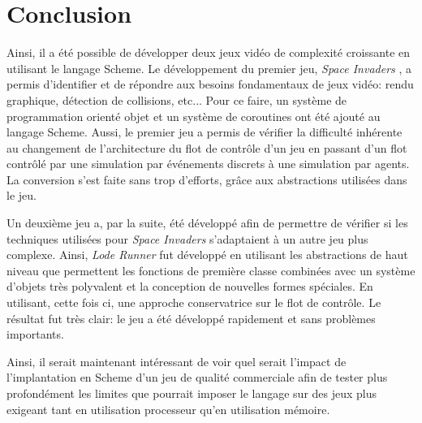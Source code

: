 \documentclass[12pt,oneside,letterpaper,francais]{book}
\newcommand{\lr}{{\textit{Lode Runner }}}
\newcommand{\si}{{\textit{Space Invaders }}}
\begin{document}
\section{Conclusion}
Ainsi, il a été possible de développer deux jeux vidéo de complexité
croissante en utilisant le langage Scheme. Le développement du premier
jeu, \si, a permis d'identifier et de répondre aux besoins
fondamentaux de jeux vidéo: rendu graphique, détection de collisions,
etc... Pour ce faire, un système de programmation orienté objet et un
système de coroutines ont été ajouté au langage Scheme. Aussi, le
premier jeu a permis de vérifier la difficulté inhérente au changement
de l'architecture du flot de contrôle d'un jeu en passant d'un flot
contrôlé par une simulation par événements discrets à une simulation
par agents. La conversion s'est faite sans trop d'efforts, grâce aux
abstractions utilisées dans le jeu.

Un deuxième jeu a, par la suite, été développé afin de permettre de
vérifier si les techniques utilisées pour \si s'adaptaient à un autre
jeu plus complexe. Ainsi, \lr fut développé en utilisant les
abstractions de haut niveau que permettent les fonctions de première
classe combinées avec un système d'objets très polyvalent et la
conception de nouvelles formes spéciales. En utilisant, cette fois ci,
une approche conservatrice sur le flot de contrôle. Le résultat fut
très clair: le jeu a été développé rapidement et sans problèmes
importants.

Ainsi, il serait maintenant intéressant de voir quel serait l'impact
de l'implantation en Scheme d'un jeu de qualité commerciale afin de
tester plus profondément les limites que pourrait imposer le langage
sur des jeux plus exigeant tant en utilisation processeur qu'en
utilisation mémoire.
\end{document}

